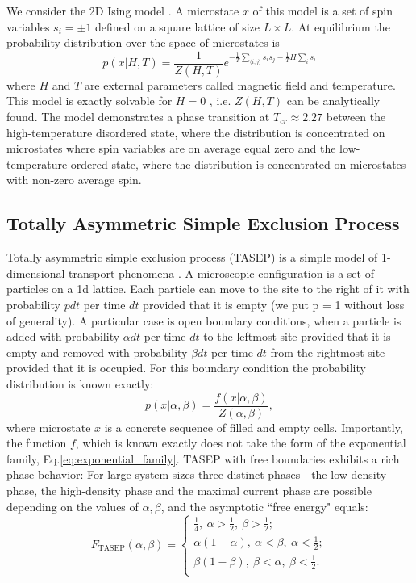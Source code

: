 \documentclass{article}
\theoremstyle{plain}
\theoremstyle{definition}
\theoremstyle{remark}
\begin{document}
We consider the 2D Ising model \cite{ising1925beitrag}. A microstate $x$ of this model is a set of spin variables $s_i = \pm 1$ defined on a square lattice of size $L\times L$. At equilibrium the probability distribution over the space of microstates is
\begin{equation}
    p(x|H, T) = \frac{1}{Z(H, T)} e^{- \frac{1}{T} \sum_{\langle i,j \rangle}s_{i}s_{j} - \frac{1}{T} H \sum_{i} s_{i}}
    \label{eq:ising_likelihood}
\end{equation}
where $H$ and $T$ are external parameters called magnetic field and temperature. This model is exactly solvable for $H=0$ \cite{onsager1944crystal, kac1952combinatorial, baxter1978399th}, i.e. $Z(H,T)$ can be analytically found.
The model demonstrates a phase transition at $T_{cr}\approx 2.27$ between the high-temperature disordered state, where the distribution is concentrated on microstates where spin variables are on average equal zero and the low-temperature ordered state, where the distribution is concentrated on microstates with non-zero average spin.


\subsection{Totally Asymmetric Simple Exclusion Process}

Totally asymmetric simple exclusion process (TASEP) is a simple model of 1-dimensional transport phenomena \cite{dehp, evans_review, krapivsky_book}. A microscopic configuration is a set of particles on a 1d lattice. Each particle can move to the site to the right of it with probability $p dt$ per time $dt$ provided that it is empty (we put p = 1 without loss of generality). 
A particular case is open boundary conditions, when a particle is added with probability $\alpha dt$ per time $dt$ to the leftmost site provided that it is empty and removed with probability $\beta dt$ per time $dt$ from the rightmost site provided that it is occupied. For this boundary condition the probability distribution is known exactly:
\begin{equation}
p(x|\alpha, \beta) = \frac{f(x|\alpha, \beta)}{Z(\alpha, \beta)} ,
\end{equation}
where microstate $x$ is a concrete sequence of filled and empty cells. Importantly, the function $f$, which is known exactly does not take the form of the exponential family, Eq.\eqref{eq:exponential_family}. TASEP with free boundaries exhibits a rich phase behavior: For large system sizes three distinct phases - the low-density phase, the high-density phase and the maximal current phase are possible depending on the values of $\alpha, \beta$, and the asymptotic ``free energy"  equals:
\begin{equation}
F_{\text{TASEP}}(\alpha, \beta) = 
\begin{cases}
\frac{1}{4}, \ \alpha>\frac{1}{2}, \ \beta>\frac{1}{2};\\
\alpha(1-\alpha), 
 \ \alpha<\beta, \ \alpha<\frac{1}{2};\\
\beta(1-\beta), 
\ \beta<\alpha, \ \beta<\frac{1}{2}.\\
\end{cases}
\end{equation}
\end{document}
